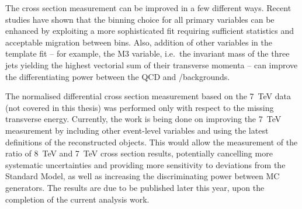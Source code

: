 The cross section measurement can be improved in a few different ways. Recent studies have shown that the binning choice
for all primary variables can be enhanced by exploiting a more sophisticated fit requiring sufficient statistics and
acceptable migration between bins. Also, addition of other variables in the template fit -- for example, the M3
variable, i.e.\ the invariant mass of the three jets yielding the highest vectorial sum of their transverse momenta --
can improve the differentiating power between the QCD and \W/\ZpJets backgrounds.

The normalised differential cross section measurement based on the \SI{7}{\TeV} data \autocite{xsection_PAS_7TeV} (not
covered in this thesis) was performed only with respect to the missing transverse energy. Currently, the work is being
done on improving the \SI{7}{\TeV} measurement by including other event-level variables and using the latest definitions
of the reconstructed objects. This would allow the measurement of the ratio of \SI{8}{\TeV} and \SI{7}{\TeV} cross
section results, potentially cancelling more systematic uncertainties and providing more sensitivity to deviations from
the Standard Model, as well as increasing the discriminating power between MC generators. The results are due to be
published later this year, upon the completion of the current analysis work.




